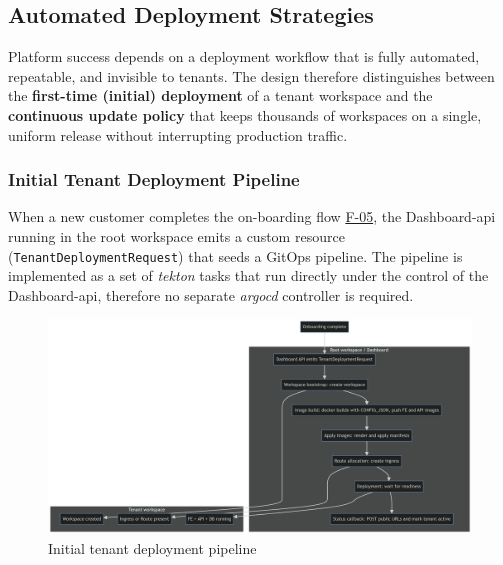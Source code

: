 \documentclass[11pt, a4paper, oneside, listof=totoc]{scrartcl}
\begin{document}
        \clearpage

        \subsection{Automated Deployment Strategies}\label{subsec:deploymentStrategies}
            Platform success depends on a deployment workflow that is fully automated, repeatable,
            and invisible to tenants.
            The design therefore distinguishes between the \textbf{first-time (initial) deployment}
            of a tenant workspace and the \textbf{continuous update policy} that keeps thousands of
            workspaces on a single, uniform release without interrupting production traffic.

            \FloatBarrier
            \subsubsection{Initial Tenant Deployment Pipeline}\label{subsubsec:initialDeeployment}
                When a new customer completes the on-boarding flow \hyperlink{f5}{F-05}, the
                Dashboard-\gls{api} running in the root workspace emits a custom resource
                (\texttt{TenantDeploymentRequest}) that seeds a GitOps pipeline.
                The pipeline is implemented as a set of \textit{\gls{tekton}} tasks that run
                directly under the control of the Dashboard-\gls{api}, therefore no separate
                \textit{\gls{argocd}} controller is required.

                \begin{figure}[tbp]
                    \centering
                    \includegraphics[width=\textwidth]{images/pipeline.png}
                    \caption{Initial tenant deployment pipeline}\label{fig:initial-deployment-pipeline}
                \end{figure}
\end{document}
